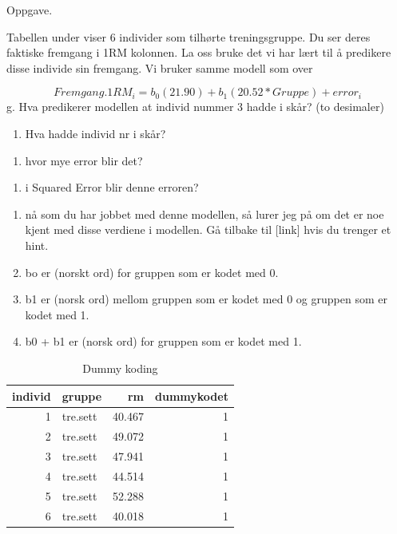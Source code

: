 \documentclass[
]{book}
\providecommand{\tightlist}{%
  \setlength{\itemsep}{0pt}\setlength{\parskip}{0pt}}
\begin{document}
{Oppgave}.

Tabellen under viser 6 individer som tilhørte treningsgruppe. Du ser deres faktiske fremgang i 1RM kolonnen. La oss bruke det vi har lært til å predikere disse individe sin fremgang. Vi bruker samme modell som over

\[
Fremgang.1RM_i = b_0(21.90) + b_1(20.52*Gruppe) + error_i
\]
g. Hva predikerer modellen at individ nummer 3 hadde i skår? (to desimaler)

\begin{enumerate}
\def\labelenumi{\alph{enumi}.}
\setcounter{enumi}{7}
\tightlist
\item
  Hva hadde individ nr i skår?
\end{enumerate}

\begin{enumerate}
\def\labelenumi{\roman{enumi}.}
\tightlist
\item
  hvor mye error blir det?
\end{enumerate}

\begin{enumerate}
\def\labelenumi{\alph{enumi}.}
\setcounter{enumi}{9}
\tightlist
\item
  i Squared Error blir denne erroren?
\end{enumerate}

\begin{enumerate}
\def\labelenumi{\alph{enumi}.}
\setcounter{enumi}{10}
\item
  nå som du har jobbet med denne modellen, så lurer jeg på om det er noe kjent med disse verdiene i modellen. Gå tilbake til {[}link{]} hvis du trenger et hint.
\item
  bo er (norskt ord) for gruppen som er kodet med 0.
\item
  b1 er (norsk ord) mellom gruppen som er kodet med 0 og gruppen som er kodet med 1.
\item
  b0 + b1 er (norsk ord) for gruppen som er kodet med 1.
\end{enumerate}

\begin{table}

\caption{\label{tab:unnamed-chunk-11}Dummy koding}
\centering
\begin{tabular}[t]{r|l|r|r}
\hline
individ & gruppe & rm & dummykodet\\
\hline
1 & tre.sett & 40.467 & 1\\
\hline
2 & tre.sett & 49.072 & 1\\
\hline
3 & tre.sett & 47.941 & 1\\
\hline
4 & tre.sett & 44.514 & 1\\
\hline
5 & tre.sett & 52.288 & 1\\
\hline
6 & tre.sett & 40.018 & 1\\
\hline
\end{tabular}
\end{table}
\end{document}
